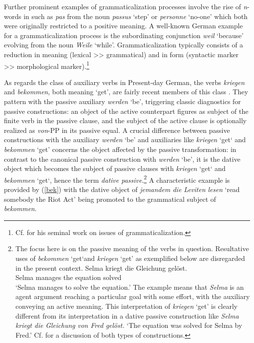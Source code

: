 \documentclass[output=paper
                ,modfonts
                ,nonflat
	        ,collection
	        ,collectionchapter
	        ,collectiontoclongg
 	        ,biblatex
                ,babelshorthands
                ,newtxmath
                ,draftmode
                ,colorlinks, citecolor=brown
]{./langsci/langscibook}
\begin{document}
Further prominent examples of grammaticalization processes involve the rise of \textit{n}-words in  such as  \textit{pas} from the  noun \textit{passus} `step' or \textit{personne} `no-one' which both were originally restricted to a positive meaning. A well-known German example for a grammaticalization process is the subordinating conjunction \textit{weil} `because' evolving from the noun \textit{Weile} `while'. Grammaticalization typically consists of a reduction in meaning (lexical >> grammatical) and in form (syntactic marker >> morphological marker).\footnote{Cf. \cite{lehmann2015} for his seminal work on issues of grammaticalization.}

As regards the class of auxiliary verbs in Present-day German, the verbs \textit{kriegen} and \textit{bekommen}, both meaning `get', are fairly recent members of this class \citep{reis1976}. They pattern with the passive auxiliary \textit{werden} `be', triggering classic diagnostics for passive constructions: an object of the  active counterpart figures as subject of the finite verb in the passive clause, and the subject of the active clause is optionally realized as \textit{von}-PP in its passive equal. A crucial difference between passive constructions with the auxiliary \textit{werden} `be' and auxiliaries like \textit{kriegen} `get` and \textit{bekommen} `get' concerns the object affected by the passive transformation: in contrast to the canonical passive construction with \textit{werden} `be', it is the dative object which becomes the subject of passive clauses with \textit{kriegen} `get` and \textit{bekommen} `get`, hence the term \textit{dative passive}.\footnote{The focus here is on the passive meaning of the verbs in question. Resultative uses of \textit{bekommen} `get`and \textit{kriegen} `get' as exemplified below are disregarded in the present context. 
\ea
\gll Selma kriegt die Gleichung gelöst. \\ Selma manages the equation solved  \\
\glt  `Selma manages to solve the equation.' 
\z
The example means that \textit{Selma} is an agent argument reaching a particular goal with some effort, with the auxiliary conveying an active meaning. This interpretation of \textit{kriegen} `get' is clearly different from its interpretation in a dative passive construction like \textit{Selma kriegt die Gleichung von Fred gelöst.} `The equation was solved for Selma by Fred.' Cf. \cite{reis1985a} for a discussion of both types of constructions.}  A characteristic example is provided by (\ref{bek}) with the dative object of \textit{jemandem die Leviten lesen} `read somebody the Riot Act'  being promoted to the grammatical subject of \textit{bekommen}. 
\end{document}
